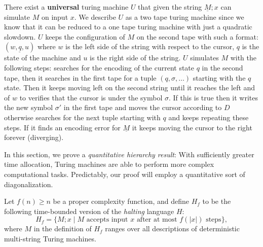 \documentclass[12pt]{article}
\begin{document}
\begin{defbox}
  There exist a \textbf{universal} turing machine $U$ that given the string $\underline M;x$ can simulate $M$ on input $x$. We describe $U$ as a two tape turing machine since we know that it can be reduced to a one tape turing machine with just a quadratic slowdown. $U$ keeps the configuration of $M$ on the second tape with such a format: $(\underline{w, q, u})$ where $w$ is the left side of the string with respect to the cursor, $q$ is the state of the machine and $u$ is the right side of the string. $U$ simulates $M$ with the following steps: searches for the encoding of the current state $q$ in the second tape, then it searches in the first tape for a tuple $(q,\sigma,\dots)$ starting with the $q$ state. Then it keeps moving left on the second string until it reaches the left and of $w$ to verifies that the cursor is under the symbol $\sigma$. If this is true then it writes the new symbol $\sigma'$ in the first tape and moves the cursor according to $D$ otherwise searches for the next tuple starting with $q$ and keeps repeating these steps. If it finds an encoding error for $\underline M$ it keeps moving the cursor to the right forever (diverging).
  \end{defbox}
In this section, we prove a \textit{quantitative hierarchy result}: With sufficiently greater time allocation, Turing machines are able to perform more complex computational tasks. Predictably, our proof will employ a quantitative sort of diagonalization.

Let $f(n) \geq n$ be a proper complexity function, and define $H_f$ to be the following time-bounded version of the \textit{halting} language $H$:
\[
H_f = \{M; x \;|\; M \text{ accepts input } x \text{ after at most } f(|x|) \text{ steps}\},
\]
where $M$ in the definition of $H_f$ ranges over all descriptions of deterministic multi-string Turing machines. 
\end{document}
